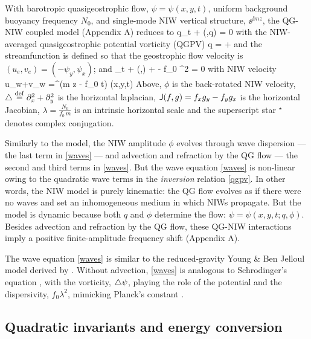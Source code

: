 \documentclass{jfm}
\begin{document}
With barotropic quasigeostrophic flow, $\psi=\psi(x,y,t)$,
uniform background buoyancy frequency $N_0$, and
single-mode NIW vertical structure, $\ee^{\ii m z}$, the \cite{xie_vanneste2015}
QG-NIW coupled model (Appendix A) reduces to
\beq
\label{macroturb}
q_t + \sJ(\psi,q) = 0\com
\eeq
with the NIW-averaged quasigeostrophic potential vorticity (QGPV)
\beq
\label{qgpv}
q = \lap \psi +
                 \com
\eeq
and the streamfunction is defined so that the geostrophic flow velocity is
$(u_e, v_e) = (-\psi_y, \psi_x)$; and
\beq
\label{waves}
\phi_t + \sJ(\psi,\phi) + \phi\lap \psi -  f_0 \lambda^2 \lap \phi
 = 0\com
\eeq
with NIW velocity
\beq
\label{niw_velocity}
u_w+\ii v_w  =\ee^{\ii (m z - f_0 t)} \phi(x,y,t)\per
\eeq
Above,
$\phi$ is the back-rotated NIW
velocity, $\triangle \stackrel{\mathrm{def}}{=} \partial_x^2 + \partial_y^2$ is the horizontal laplacian,
$\mathsf{J}(f,g)=f_x g_y - f_y g_x$ is the horizontal Jacobian,
$\lambda = \tfrac{N_0}{f_0\, m}$  is an intrinsic horizontal scale and
the superscript star $^\star$ denotes complex conjugation.

Similarly to the \cite{young_benjelloul1997} model, the NIW amplitude $\phi$
evolves through wave dispersion --- the last term in \eqref{waves} --- and
advection and refraction by the QG flow --- the second and third terms in
\eqref{waves}. But the wave equation \eqref{waves} is non-linear owing to the
quadratic wave terms in the \textit{inversion} relation \eqref{qgpv}. In other
words, the
\cite{young_benjelloul1997} NIW model is purely kinematic: the QG flow evolves as
if there were no waves and set an inhomogeneous medium in which NIWs propagate.
But the \cite{xie_vanneste2015} model is dynamic because both $q$ and $\phi$
determine the flow: $\psi=\psi(x,y,t; q, \phi)$. Besides advection and refraction
by the QG flow, these QG-NIW interactions imply a positive finite-amplitude
frequency shift (Appendix A).

The wave equation \eqref{waves} is similar to the reduced-gravity
Young \& Ben Jelloul model derived by  \cite{danioux_etal2015}. Without advection,
\eqref{waves} is analogous to Schrodinger's equation
\citep[e.g.,][ pg. 51]{landau_lifshitz2013}, with the vorticity, $\triangle\psi$,
playing the role of the
potential and the dispersivity, $f_0\lambda^2$, mimicking Planck's constant
\citep{danioux_etal2015}.

\subsection{Quadratic invariants and energy conversion}
\end{document}
